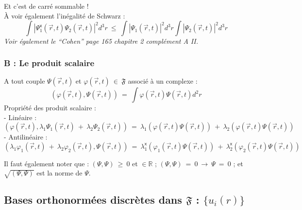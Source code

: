 \documentclass[12pt,a4paper,titlepage]{book}
\begin{document}
Et c'est de carré sommable !\\

À voir également l'inégalité de Schwarz :\\
\begin{equation*}
\int |\Psi_1^{\mathsf{x}} (\overrightarrow{r}, t) \Psi_2 (\overrightarrow{r}, t)|^2 d^3 r ~\leqslant~ \int |\Psi_1 (\overrightarrow{r}, t)|^2 d^3 r \int |\Psi_2 (\overrightarrow{r}, t)|^2 d^3 r
\end{equation*}
\textit{Voir également le \enquote{Cohen} page 165 chapitre 2 complément A II.}

\subsubsection{B : Le produit scalaire}

A tout couple $\Psi (\overrightarrow{r}, t)$ et $\varphi (\overrightarrow{r}, t) ~\in~ \mathfrak{F}$ associé à un complexe :
\begin{equation*}
(\varphi (\overrightarrow{r}, t), \Psi (\overrightarrow{r}, t)) ~=~ \int \varphi (\overrightarrow{r}, t) \Psi (\overrightarrow{r}, t) d^2 r
\end{equation*}
Propriété des produit scalaire :\\
- Linéaire :
\begin{equation*}
(\varphi (\overrightarrow{r}, t), \lambda_1 \Psi_1 (\overrightarrow{r}, t) ~+~ \lambda_2 \Psi_2 (\overrightarrow{r}, t)) ~=~ \lambda_1 (\varphi (\overrightarrow{r}, t) \Psi (\overrightarrow{r}, t)) ~+~ \lambda_2 (\varphi (\overrightarrow{r}, t) \Psi (\overrightarrow{r}, t))
\end{equation*}
- Antilinéaire :
\begin{equation*}
(\lambda_1 \varphi_1 (\overrightarrow{r}, t) ~+~ \lambda_2 \varphi_2 (\overrightarrow{r}, t), \Psi (\overrightarrow{r}, t)) ~=~ \lambda_1^{\mathsf{x}} (\varphi_1 (\overrightarrow{r}, t) \Psi (\overrightarrow{r}, t)) ~+~ \lambda_2^{\mathsf{x}} (\varphi_2 (\overrightarrow{r}, t) \Psi (\overrightarrow{r}, t))
\end{equation*}

Il faut également noter que : $(\Psi, \Psi) ~\geq~ 0$ et $\in \mathbb{R}$ ; $(\Psi, \Psi) ~=~ 0 ~\rightarrow~ \Psi ~=~ 0$ ; et $\sqrt{(\Psi, \Psi)}$ est la norme de $\Psi$.

\subsection{Bases orthonormées discrètes dans $\mathfrak{F}$ : $\lbrace u_i (r)\rbrace $}
\end{document}
